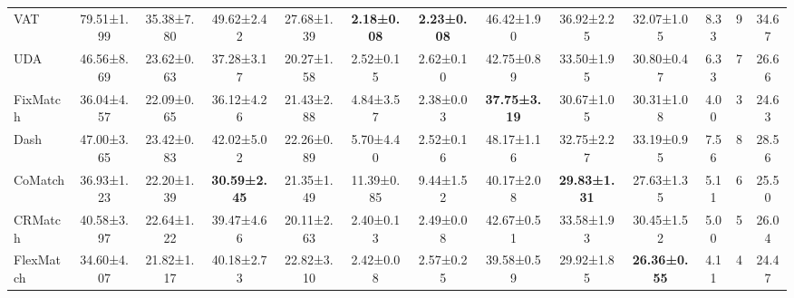 \documentclass{article}
\begin{document}
\begin{table}[t!]
{\begin{tabular}{l|cc|cc|cc|cc|c|c|c|c}
VAT              & 79.51\tiny{±1.99}          & 35.38\tiny{±7.80}          & 49.62\tiny{±2.42}          & 27.68\tiny{±1.39}          & \textbf{2.18\tiny{±0.08}} & \textbf{2.23\tiny{±0.08}} & 46.42\tiny{±1.90}          & 36.92\tiny{±2.25}          & 32.07\tiny{±1.05}          & 8.33                              & 9                              & 34.67                               \\
UDA              & 46.56\tiny{±8.69}          & 23.62\tiny{±0.63}          & 37.28\tiny{±3.17}          & 20.27\tiny{±1.58}          & 2.52\tiny{±0.15}          & 2.62\tiny{±0.10}          & 42.75\tiny{±0.89}          & 33.50\tiny{±1.95}          & 30.80\tiny{±0.47}          & 6.33                              & 7                              & 26.66                               \\
FixMatch         & 36.04\tiny{±4.57}          & 22.09\tiny{±0.65}          & 36.12\tiny{±4.26}          & 21.43\tiny{±2.88}          & 4.84\tiny{±3.57}          & 2.38\tiny{±0.03}          & \textbf{37.75\tiny{±3.19}} & 30.67\tiny{±1.05}          & 30.31\tiny{±1.08}          & 4.00                              & 3                              & 24.63                               \\
Dash             & 47.00\tiny{±3.65}          & 23.42\tiny{±0.83}          & 42.02\tiny{±5.02}          & 22.26\tiny{±0.89}          & 5.70\tiny{±4.40}          & 2.52\tiny{±0.16}          & 48.17\tiny{±1.16}          & 32.75\tiny{±2.27}          & 33.19\tiny{±0.95}          & 7.56                              & 8                              & 28.56                               \\
CoMatch          & 36.93\tiny{±1.23}          & 22.20\tiny{±1.39}          & \textbf{30.59\tiny{±2.45}} & 21.35\tiny{±1.49}          & 11.39\tiny{±0.85}         & 9.44\tiny{±1.52}          & 40.17\tiny{±2.08}          & \textbf{29.83\tiny{±1.31}} & 27.63\tiny{±1.35}          & 5.11                              & 6                              & 25.50                               \\
CRMatch          & 40.58\tiny{±3.97}          & 22.64\tiny{±1.22}          & 39.47\tiny{±4.66}          & 20.11\tiny{±2.63}          & 2.40\tiny{±0.13}          & 2.49\tiny{±0.08}          & 42.67\tiny{±0.51}          & 33.58\tiny{±1.93}          & 30.45\tiny{±1.52}          & 5.00                              & 5                              & 26.04                               \\
FlexMatch        & 34.60\tiny{±4.07}          & 21.82\tiny{±1.17}          & 40.18\tiny{±2.73}          & 22.82\tiny{±3.10}          & 2.42\tiny{±0.08}          & 2.57\tiny{±0.25}          & 39.58\tiny{±0.59}          & 29.92\tiny{±1.85}          & \textbf{26.36\tiny{±0.55}} & 4.11                              & 4                              & 24.47                               \\

\end{tabular}}
\end{table}
\end{document}
